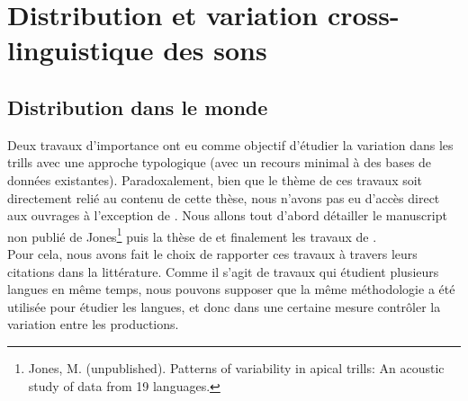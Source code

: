 \section{Distribution et variation cross-linguistique des sons }

\subsection{Distribution dans le monde}

Deux travaux d'importance ont eu comme objectif d'étudier la variation dans les trills avec une approche typologique (avec un recours minimal à des bases de données existantes). Paradoxalement, bien que le thème de ces travaux soit directement relié au contenu de cette thèse, nous n'avons pas eu d'accès direct aux ouvrages à l'exception de \textcite{lindauStory1985}.
Nous allons tout d'abord détailler le manuscript non publié de Jones\footnote{Jones, M. (unpublished). Patterns of variability in apical trills: An acoustic study of data from 19 languages.} puis la thèse de \textcite{inouyeTrillsTapsStops1995} et finalement les travaux de \textcite{lindauStory1985}.\\

Pour cela, nous avons fait le choix de rapporter ces travaux à travers leurs citations dans la littérature. Comme il s'agit de travaux qui étudient plusieurs langues en même temps, nous pouvons supposer que la même méthodologie a été utilisée pour étudier les langues, et donc dans une certaine mesure contrôler la variation entre les productions.\\

